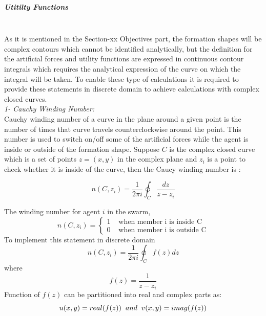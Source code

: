 \documentclass[twoside]{article}
\begin{document}
     \subparagraph{Utitilty Functions}\hspace{0pt} \\
		As it is mentioned in the Section-xx Objectives part, the formation shapes will be complex contours which cannot be identified analytically, but the definition for the artificial forces and utility functions are expressed in continuous contour integrals which requires the analytical expression of the curve on which the integral will be taken. To enable these type of calculations it is required to provide these statements in discrete domain to achieve calculations with complex closed curves. \\ \newline
\textit{ 		1- Cauchy Winding Number:} \\ 
		Cauchy winding number of a curve in the plane around a given point is the number of times that curve travels counterclockwise around the point. This number is used to switch on/off some of the artificial forces while the agent is inside or outside of the formation shape. Suppose $C$ is the complex closed curve which is a set of points $z=(x,y)$ in the complex plane  and $z_i$ is a point to check whether it is inside of the curve, then the Caucy winding number is :
					
		\begin{equation}
 n(C,z_i) = \frac{1}{2\pi i}\oint_C \frac{dz}{z-z_i}
 		\end{equation}
		
		The winding number for agent $i$ in the swarm,
\begin{equation}
n(C,z_i) = \left\{ \begin{array}{rl}
1 &\mbox{ when member i is inside C} \\
0 &\mbox{ when member i is outside C}
\end{array} \right.
\end{equation}
		To implement this statement in discrete domain 
		\begin{equation}
n(C,z_i) = \frac{1}{2\pi i} \oint_C f(z)dz
		\end{equation}
		where 
		\begin{equation}
f(z) = \frac{1}{z-z_i}
		\end{equation}
		Function of $f(z)$ can be partitioned into real and complex parts as:
		\begin{equation}
u(x,y) = real(f(z))  \hspace{0.2cm} and \hspace{0.2cm} v(x,y) = imag(f(z))
		\end{equation}
		
\end{document}
